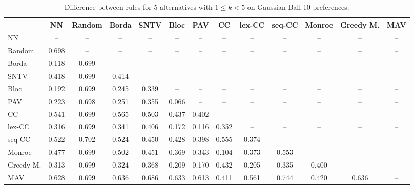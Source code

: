 
\begin{table*}[h!]
\centering
\begin{tabular}{lcccccccccccc}
\toprule
 & NN & Random & Borda & SNTV & Bloc & PAV & CC & lex-CC & seq-CC & Monroe & Greedy M. & MAV \\
\midrule
NN & -- & -- & -- & -- & -- & -- & -- & -- & -- & -- & -- & -- \\
Random & 0.698 & -- & -- & -- & -- & -- & -- & -- & -- & -- & -- & -- \\
Borda & 0.118 & 0.699 & -- & -- & -- & -- & -- & -- & -- & -- & -- & -- \\
SNTV & 0.418 & 0.699 & 0.414 & -- & -- & -- & -- & -- & -- & -- & -- & -- \\
Bloc & 0.192 & 0.699 & 0.245 & 0.339 & -- & -- & -- & -- & -- & -- & -- & -- \\
PAV & 0.223 & 0.698 & 0.251 & 0.355 & 0.066 & -- & -- & -- & -- & -- & -- & -- \\
CC & 0.541 & 0.699 & 0.565 & 0.503 & 0.437 & 0.402 & -- & -- & -- & -- & -- & -- \\
lex-CC & 0.316 & 0.699 & 0.341 & 0.406 & 0.172 & 0.116 & 0.352 & -- & -- & -- & -- & -- \\
seq-CC & 0.522 & 0.702 & 0.524 & 0.450 & 0.428 & 0.398 & 0.555 & 0.374 & -- & -- & -- & -- \\
Monroe & 0.477 & 0.699 & 0.502 & 0.451 & 0.369 & 0.343 & 0.104 & 0.373 & 0.553 & -- & -- & -- \\
Greedy M. & 0.313 & 0.699 & 0.324 & 0.368 & 0.209 & 0.170 & 0.432 & 0.205 & 0.335 & 0.400 & -- & -- \\
MAV & 0.628 & 0.699 & 0.636 & 0.686 & 0.633 & 0.613 & 0.411 & 0.561 & 0.744 & 0.420 & 0.636 & -- \\
\bottomrule
\end{tabular}

\caption{Difference between rules for 5 alternatives with $1 \leq k < 5$ on Gaussian Ball 10 preferences.}
\end{table*}
